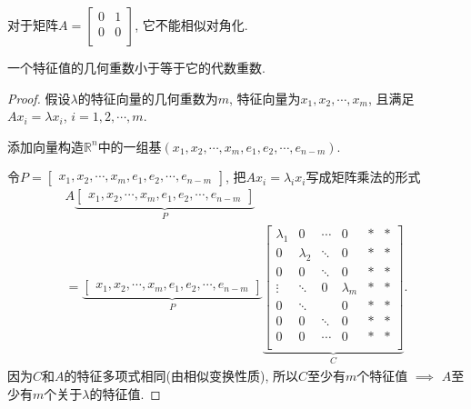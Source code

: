 \begin{example}
    对于矩阵$A = \begin{bmatrix}
     0 & 1\\
     0 & 0\\
    \end{bmatrix}$, 它不能相似对角化. 
\end{example}

\begin{theorem}
    一个特征值的几何重数小于等于它的代数重数.
\end{theorem}

\begin{proof}
    假设$\lambda$的特征向量的几何重数为$m$, 特征向量为$x_1,x_2,\cdots,x_m$, 且满足$A x_i = \lambda x_i$, $i = 1, 2, \cdots, m$.

    添加向量构造$\mathbb{R}^{n}$中的一组基$\left( x_1,x_2,\cdots,x_m, e_1,e_2,\cdots,e_{n-m} \right) $. 
    
    令$P = \begin{bmatrix} x_1,x_2,\cdots,x_m, e_1,e_2,\cdots,e_{n-m} \end{bmatrix}$, 把$Ax_i = \lambda_i x_i $写成矩阵乘法的形式
    \begin{equation}
        \begin{gathered}
            A \underbrace{\begin{bmatrix} x_1,x_2,\cdots,x_m, e_1,e_2,\cdots,e_{n-m} \end{bmatrix}}_{P} 
            \\
            =
            \underbrace{\begin{bmatrix} x_1,x_2,\cdots,x_m, e_1,e_2,\cdots,e_{n-m} \end{bmatrix}}_{P} 
            \underbrace{\left[ 
                \begin{array}{cccc|cc}
                    \lambda_1 &0 & \cdots& 0&* &* \\
                    0& \lambda_2 &\ddots & 0&* &* \\
                    0& 0& \ddots & 0&* &* \\
                    \vdots& \ddots&  0& \lambda_m &* &* \\
                    \hline
                    0& \ddots& &0 &*  &* \\
                    0& 0& \ddots & 0& *& * \\
                    0& 0&\cdots &0& *& * \\
                    \end{array}
             \right] 
            }_{C}.
        \end{gathered}
    \end{equation}
    因为$C$和$A$的特征多项式相同(由相似变换性质), 所以$C$至少有$m$个特征值 $\implies$ $A$至少有$m$个关于$\lambda$的特征值.
\end{proof}

